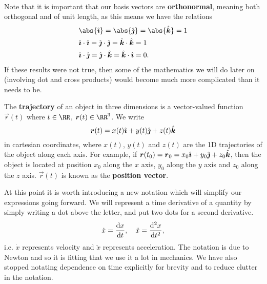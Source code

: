 \documentclass[../classical_mechanics.tex]{subfiles}
\begin{document}
        \paragraph{}
        Note that it is important that our basis vectors are \textbf{orthonormal}, meaning both orthogonal and of unit length, as this means we have the relations
        \begin{align}
            &\abs{\ihat}=\abs{\jhat}=\abs{\khat}=1\label{eq-basis-vec-magnitude}\\
            &\ihat\cdot\ihat=\jhat\cdot\jhat=\khat\cdot\khat=1\label{eq-basis-vec-normal}\\
            &\ihat\cdot\jhat=\jhat\cdot\khat=\khat\cdot\ihat=0\label{eq-basis-vec-ortho}.
        \end{align}
        If these results were not true, then some of the mathematics we will do later on (involving dot and cross products) would become much more complicated than it needs to be.
        \begin{definition}
            The \textbf{trajectory} of an object in three dimensions is a vector-valued function $\vec{r}(t)$ where $t\in\RR$, $\vec{r}(t)\in\RR^3$.
            We write
            \begin{equation}
                \boldsymbol{r}(t)=x(t)\hat{\boldsymbol{\imath}}+y(t)\hat{\boldsymbol{\jmath}}+z(t)\hat{\boldsymbol{k}}
            \end{equation}
            in cartesian coordinates, where $x(t)$, $y(t)$ and $z(t)$ are the 1D trajectories of the object along each axis.
            For example, if $\boldsymbol{r}(t_0)=\boldsymbol{r}_0=x_0\hat{\boldsymbol{\imath}}+y_0\hat{\boldsymbol{\jmath}}+z_0\hat{\boldsymbol{k}}$, then the object is located at position $x_0$ along the $x$ axis, $y_0$ along the $y$ axis and $z_0$ along the $z$ axis.
            $\vec{r}(t)$ is known as the \textbf{position vector}.
        \end{definition}
        At this point it is worth introducing a new notation which will simplify our expressions going forward.
        We will represent a time derivative of a quantity by simply writing a dot above the letter, and put two dots for a second derivative.
        \begin{equation}
            \dot{x}=\dv{x}{t},\quad\ddot{x}=\dv[2]{x}{t},
        \end{equation}
        i.e. $\dot x$ represents velocity and $\ddot x$ represents acceleration.
        The notation is due to Newton and so it is fitting that we use it a lot in mechanics.
        We have also stopped notating dependence on time explicitly for brevity and to reduce clutter in the notation.
\end{document}
